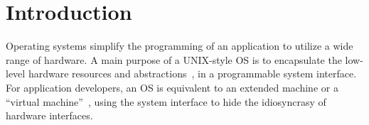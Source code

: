 \chapter{Introduction}
\label{chap:intro}


Operating systems simplify the programming of an application to utilize a wide range of hardware.
A main purpose of a UNIX-style OS
is to encapsulate the low-level hardware resources and abstractions~\cite{ritchie74unix}, in a programmable system interface.
For application developers,
an OS is equivalent to 
an extended machine or a ``virtual machine''~\cite{tanenbaum19os-textbook,dhamdhere2007os-textbook},
using the system interface
to hide the idiosyncrasy of hardware interfaces.
